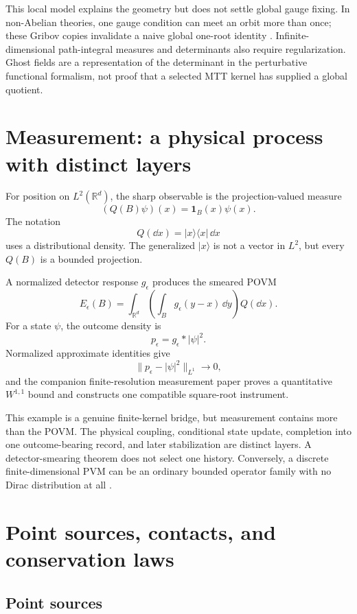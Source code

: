 \documentclass[11pt]{article}
\begin{document}
This local model explains the geometry but does not settle global gauge
fixing. In non-Abelian theories, one gauge condition can meet an orbit more
than once; these Gribov copies invalidate a naive global one-root identity
\cite{Gribov1978}. Infinite-dimensional path-integral measures and
determinants also require regularization. Ghost fields are a representation
of the determinant in the perturbative functional formalism, not proof that a
selected MTT kernel has supplied a global quotient.

\section{Measurement: a physical process with distinct layers}

For position on \(L^2(\mathbb R^d)\), the sharp observable is the
projection-valued measure
\[
(Q(B)\psi)(x)=\mathbf 1_B(x)\psi(x).
\]
The notation
\[
Q(\dd x)=|x\rangle\langle x|\,\dd x
\]
uses a distributional density. The generalized \(|x\rangle\) is not a vector
in \(L^2\), but every \(Q(B)\) is a bounded projection.

A normalized detector response \(g_\epsilon\) produces the smeared POVM
\[
E_\epsilon(B)
=
\int_{\mathbb R^d}
\left(\int_B g_\epsilon(y-x)\,\dd y\right)Q(\dd x).
\]
For a state \(\psi\), the outcome density is
\[
p_\epsilon=g_\epsilon*|\psi|^2.
\]
Normalized approximate identities give
\[
\|p_\epsilon-|\psi|^2\|_{L^1}\longrightarrow0,
\]
and the companion finite-resolution measurement paper proves a quantitative
\(W^{1,1}\) bound and constructs one compatible square-root instrument.

This example is a genuine finite-kernel bridge, but measurement contains more
than the POVM. The physical coupling, conditional state update, completion
into one outcome-bearing record, and later stabilization are distinct
layers. A detector-smearing theorem does not select one history. Conversely,
a discrete finite-dimensional PVM can be an ordinary bounded operator family
with no Dirac distribution at all \cite{DaviesLewis1970,Holevo2001}.

\section{Point sources, contacts, and conservation laws}

\subsection{Point sources}
\end{document}
